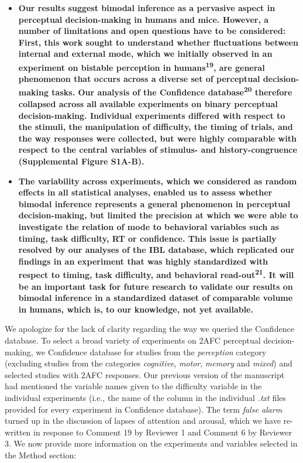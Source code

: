 \documentclass[
]{article}
\providecommand{\tightlist}{%
  \setlength{\itemsep}{0pt}\setlength{\parskip}{0pt}}
\begin{document}
\begin{itemize}
\tightlist
\item
  \textbf{Our results suggest bimodal inference as a pervasive aspect in
  perceptual decision-making in humans and mice. However, a number of
  limitations and open questions have to be considered: First, this work
  sought to understand whether fluctuations between internal and
  external mode, which we initially observed in an experiment on
  bistable perception in humans\textsuperscript{19}, are general
  phenomenon that occurs across a diverse set of perceptual
  decision-making tasks. Our analysis of the Confidence
  database\textsuperscript{20} therefore collapsed across all available
  experiments on binary perceptual decision-making. Individual
  experiments differed with respect to the stimuli, the manipulation of
  difficulty, the timing of trials, and the way responses were
  collected, but were highly comparable with respect to the central
  variables of stimulus- and history-congruence (Supplemental Figure
  S1A-B).}
\item
  \textbf{The variability across experiments, which we considered as
  random effects in all statistical analyses, enabled us to assess
  whether bimodal inference represents a general phenomenon in
  perceptual decision-making, but limited the precision at which we were
  able to investigate the relation of mode to behavioral variables such
  as timing, task difficulty, RT or confidence. This issue is partially
  resolved by our analyses of the IBL database, which replicated our
  findings in an experiment that was highly standardized with respect to
  timing, task difficulty, and behavioral read-out\textsuperscript{21}.
  It will be an important task for future research to validate our
  results on bimodal inference in a standardized dataset of comparable
  volume in humans, which is, to our knowledge, not yet available.}
\end{itemize}

We apologize for the lack of clarity regarding the way we queried the
Confidence database. To select a broad variety of experiments on 2AFC
perceptual decision-making, we Confidence database for studies from the
\emph{perception} category (excluding studies from the categories
\emph{cognitive}, \emph{motor}, \emph{memory} and \emph{mixed}) and
selected studies with 2AFC responses. Our previous version of the
manuscript had mentioned the variable names given to the difficulty
variable in the individual experiments (i.e., the name of the column in
the individual \emph{.txt} files provided for every experiment in
Confidence database). The term \emph{false alarm} turned up in the
discussion of lapses of attention and arousal, which we have re-written
in response to Comment 19 by Reviewer 1 and Comment 6 by Reviewer 3. We
now provide more information on the experiments and variables selected
in the Method section:
\end{document}
